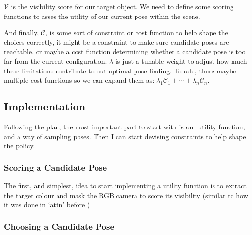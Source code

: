 $\mathcal{V}$ is the visibility score for our target object. We need to define some scoring functions to asses the utility of our current pose within the scene.

And finally, $\mathcal{C}$, is some sort of constraint or cost function to help shape the choices correctly, it might be a constraint to make sure candidate poses are reachable, or maybe a cost function determining whether a candidate pose is too far from the current configuration. $\lambda$ is just a tunable weight to adjust how much these limitations contribute to out optimal pose finding. To add, there maybe multiple cost functions so we can expand them as: \(\lambda_1\mathcal{C}_1 + \cdots +\lambda_n\mathcal{C}_n \).


\subsection{Implementation}
Following the plan, the most important part to start with is our utility function, and a way of sampling poses. Then I can start devising constraints to help shape the policy.

\subsubsection{Scoring a Candidate Pose}
The first, and simplest, idea to start implementing a utility function is to extract the target colour and mask the RGB camera to score its visibility (similar to how it was done in `attn' before )

\subsubsection{Choosing a Candidate Pose}


